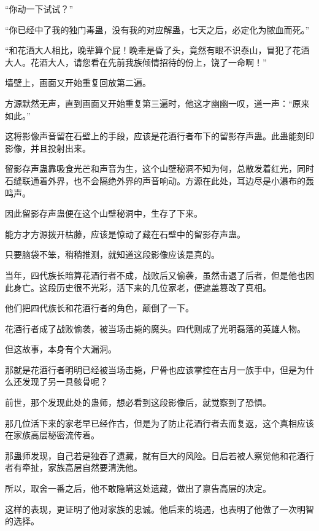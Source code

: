 
\begin{this_body}



“你动一下试试？”

“你已经中了我的独门毒蛊，没有我的对应解蛊，七天之后，必定化为脓血而死。”

“和花酒大人相比，晚辈算个屁！晚辈是昏了头，竟然有眼不识泰山，冒犯了花酒大人。花酒大人，请您看在先前我族倾情招待的份上，饶了一命啊！”

墙壁上，画面又开始重复回放第二遍。

方源默然无声，直到画面又开始重复第三遍时，他这才幽幽一叹，道一声：“原来如此。”

这将影像声音留在石壁上的手段，应该是花酒行者布下的留影存声蛊。此蛊能刻印影像，并且投射出来。

留影存声蛊靠吸食光芒和声音为生，这个山壁秘洞不知为何，总散发着红光，同时石缝联通着外界，也不会隔绝外界的声音响动。方源在此处，耳边尽是小瀑布的轰鸣声。

因此留影存声蛊便在这个山壁秘洞中，生存了下来。

能方才方源拨开枯藤，应该是惊动了藏在石壁中的留影存声蛊。

只要脑袋不笨，稍稍推测，就知道这段影像应该是真的。

当年，四代族长暗算花酒行者不成，战败后又偷袭，虽然击退了后者，但是他也因此身亡。这段历史很不光彩，活下来的几位家老，便遮盖篡改了真相。

他们把四代族长和花酒行者的角色，颠倒了一下。

花酒行者成了战败偷袭，被当场击毙的魔头。四代则成了光明磊落的英雄人物。

但这故事，本身有个大漏洞。

那就是花酒行者明明已经被当场击毙，尸骨也应该掌控在古月一族手中，但是为什么还发现了另一具骸骨呢？

前世，那个发现此处的蛊师，想必看到这段影像后，就觉察到了恐惧。

那几位活下来的家老早已经作古，但是为了防止花酒行者去而复返，这个真相应该在家族高层秘密流传着。

那蛊师发现，自己若是独吞了遗藏，就有巨大的风险。日后若被人察觉他和花酒行者有牵扯，家族高层自然要清洗他。

所以，取舍一番之后，他不敢隐瞒这处遗藏，做出了禀告高层的决定。

这样的表现，更证明了他对家族的忠诚。他后来的境遇，也表明了他做了一次明智的选择。


\end{this_body}

